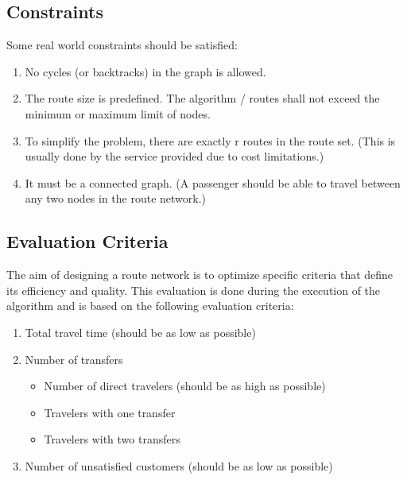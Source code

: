 


\subsection{Constraints}
Some real world constraints should be satisfied:
\begin{enumerate}
\item \label{itm:constraintCycles} No cycles (or backtracks) in the graph is allowed.
\item \label{itm:constraintRouteSize} The route size is predefined. The algorithm / routes shall not exceed the minimum or maximum limit of nodes.
\item \label{itm:constraintRouteSet} To simplify the problem, there are exactly r routes in the route set. (This is usually done by the service provided due to cost limitations.)
\item \label{itm:criteriaConnectedGraph} It must be a connected graph. (A passenger should be able to travel between any two nodes in the route network.) 
\end{enumerate}

\subsection{Evaluation Criteria} 
The aim of designing a route network is to optimize specific criteria that define its efficiency and quality. This evaluation is done during the execution of the algorithm and is based on the following evaluation criteria:
\begin{enumerate}
\item \label{itm:criteriaTotalTravelTime} Total travel time (should be as low as possible)
\item \label{itm:f2} Number of transfers
\begin{itemize}
\item Number of direct travelers (should be as high as possible)
\item Travelers with one transfer
\item Travelers with two transfers
\end{itemize}
\item \label{itm:TODO} Number of unsatisfied customers (should be as low as possible)
\end{enumerate}




